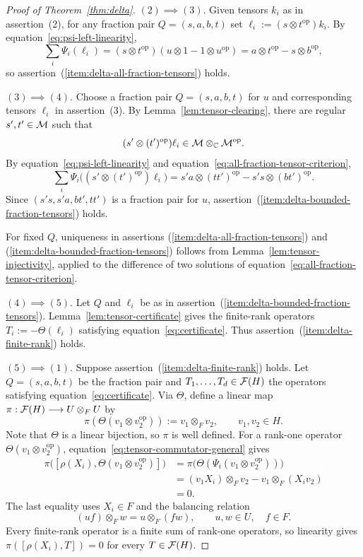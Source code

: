 \begin{proof}[Proof of Theorem~\ref{thm:delta}]
$(2)\implies(3)$.
Given tensors $k_i$ as in assertion~\textup{(2)}, for any fraction pair $Q=(s,a,b,t)$ set $\ell_i:=(s\otimes t^{\mathrm{op}})k_i$.
By equation~\eqref{eq:psi-left-linearity},
\[
 \sum_i\Psi_i(\ell_i)
 =(s\otimes t^{\mathrm{op}})
   (u\otimes1-1\otimes u^{\mathrm{op}})
 =a\otimes t^{\mathrm{op}}-s\otimes b^{\mathrm{op}},
\]
so assertion~\textup{(\ref{item:delta-all-fraction-tensors})} holds.

$(3)\implies(4)$.
Choose a fraction pair $Q=(s,a,b,t)$ for $u$ and corresponding tensors $\ell_i$ in assertion~\textup{(3)}.
By Lemma~\ref{lem:tensor-clearing}, there are regular $s',t'\in\mathcal M$ such that
\[
 (s'\otimes(t')^{\mathrm{op}})\ell_i
 \in\mathcal M\otimes_{\mathbb C}\mathcal M^{\mathrm{op}}.
\]
By equation~\eqref{eq:psi-left-linearity} and equation~\eqref{eq:all-fraction-tensor-criterion},
\[
 \sum_i\Psi_i\bigl((s'\otimes(t')^{\mathrm{op}})\ell_i\bigr)
 =s'a\otimes(tt')^{\mathrm{op}}-s's\otimes(bt')^{\mathrm{op}}.
\]
Since $(s's,s'a,bt',tt')$ is a fraction pair for $u$, assertion~\textup{(\ref{item:delta-bounded-fraction-tensors})} holds.

For fixed $Q$, uniqueness in assertions \textup{(\ref{item:delta-all-fraction-tensors})} and \textup{(\ref{item:delta-bounded-fraction-tensors})} follows from Lemma~\ref{lem:tensor-injectivity}, applied to the difference of two solutions of equation~\eqref{eq:all-fraction-tensor-criterion}.

$(4)\implies(5)$.
Let $Q$ and $\ell_i$ be as in assertion~\textup{(\ref{item:delta-bounded-fraction-tensors})}.
Lemma~\ref{lem:tensor-certificate} gives the finite-rank operators $T_i:=-\Theta(\ell_i)$ satisfying equation~\eqref{eq:certificate}.
Thus assertion~\textup{(\ref{item:delta-finite-rank})} holds.

$(5)\implies(1)$.
Suppose assertion~\textup{(\ref{item:delta-finite-rank})} holds.
Let $Q=(s,a,b,t)$ be the fraction pair and $T_1,\ldots,T_d\in\mathcal F(H)$ the operators satisfying equation~\eqref{eq:certificate}.
Via $\Theta$, define a linear map $\pi:\mathcal F(H)\longrightarrow U\otimes_FU$ by
\[
 \pi(\Theta(v_1\otimes v_2^{\mathrm{op}})):=v_1\otimes_Fv_2,
 \qquad v_1,v_2\in H.
\]
Note that $\Theta$ is a linear bijection, so $\pi$ is well defined.
For a rank-one operator $\Theta(v_1\otimes v_2^{\mathrm{op}})$, equation~\eqref{eq:tensor-commutator-general} gives
\begin{align*}
 \pi\bigl([\rho(X_i),\Theta(v_1\otimes v_2^{\mathrm{op}})]\bigr)
 &=\pi\bigl(\Theta(\Psi_i(v_1\otimes v_2^{\mathrm{op}}))\bigr)\\
 &=(v_1X_i)\otimes_Fv_2-v_1\otimes_F(X_iv_2)\\
 &=0.
\end{align*}
The last equality uses $X_i\in F$ and the balancing relation
\[
 (uf)\otimes_Fw=u\otimes_F(fw),\qquad u,w\in U,\quad f\in F.
\]
Every finite-rank operator is a finite sum of rank-one operators, so linearity gives $\pi([\rho(X_i),T])=0$ for every $T\in\mathcal F(H)$.


\end{proof}
